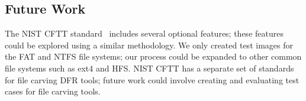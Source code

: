 \subsection{Future Work}
The NIST CFTT standard~\cite{meta:dfr:standards} includes several optional features; these features could be explored using a similar methodology.
We only created test images for the FAT and NTFS file systems; our process could be expanded to other common file systems such as ext4 and HFS.
NIST CFTT has a separate set of standards for file carving DFR tools; future work could involve creating and evaluating test cases for file carving tools.
